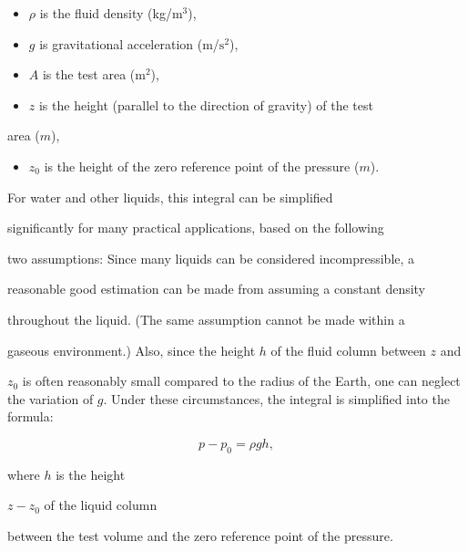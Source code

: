 \begin{itemize}
    \item $\rho$ is the fluid density (kg/$\text{m}^3$),
\end{itemize}

\begin{itemize}
    \item $g$ is gravitational acceleration (m/$\text{s}^2$),
\end{itemize}

\begin{itemize}
    \item $A$ is the test area ($\text{m}^2$),
\end{itemize}

\begin{itemize}
    \item $z$ is the height (parallel to the direction of gravity) of the test
\end{itemize}
    area ($m$),



\begin{itemize}
    \item $z _0$ is the height of the zero reference point of the pressure ($m$).
\end{itemize}

For water and other liquids, this integral can be simplified

significantly for many practical applications, based on the following

two assumptions: Since many liquids can be considered incompressible, a

reasonable good estimation can be made from assuming a constant density

throughout the liquid. (The same assumption cannot be made within a

gaseous environment.) Also, since the height $h$ of the fluid column between $z$ and

$z _0$ is often reasonably small compared to the radius of the Earth, one can neglect the variation of $g$. Under these circumstances, the integral is simplified into the formula:



$$p - p _0 = \rho g h,$$



where $h$ is the height

$z - z _0$ of the liquid column

between the test volume and the zero reference point of the pressure.

